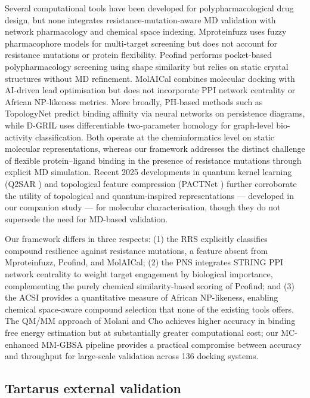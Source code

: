\documentclass[11pt,a4paper]{article}
\begin{document}
Several computational tools have been developed for polypharmacological drug design, but none integrates resistance-mutation-aware MD validation with network pharmacology and chemical space indexing. Mproteinfuzz \citep{molani_cho_2024} uses fuzzy pharmacophore models for multi-target screening but does not account for resistance mutations or protein flexibility. Pcofind performs pocket-based polypharmacology screening using shape similarity but relies on static crystal structures without MD refinement. MolAICal combines molecular docking with AI-driven lead optimisation but does not incorporate PPI network centrality or African NP-likeness metrics. More broadly, PH-based methods such as TopologyNet \citep{topologynet_2018} predict binding affinity via neural networks on persistence diagrams, while D-GRIL \citep{dgril_2026} uses differentiable two-parameter homology for graph-level bio-activity classification. Both operate at the cheminformatics level on static molecular representations, whereas our framework addresses the distinct challenge of flexible protein--ligand binding in the presence of resistance mutations through explicit MD simulation. Recent 2025 developments in quantum kernel learning (Q2SAR \citep{q2sar_2025}) and topological feature compression (PACTNet \citep{pactnet_2025}) further corroborate the utility of topological and quantum-inspired representations --- developed in our companion study \citep{temgoua2026quantum} --- for molecular characterisation, though they do not supersede the need for MD-based validation.

Our framework differs in three respects: (1) the RRS explicitly classifies compound resilience against resistance mutations, a feature absent from Mproteinfuzz, Pcofind, and MolAICal; (2) the PNS integrates STRING PPI network centrality to weight target engagement by biological importance, complementing the purely chemical similarity-based scoring of Pcofind; and (3) the ACSI provides a quantitative measure of African NP-likeness, enabling chemical space-aware compound selection that none of the existing tools offers. The QM/MM approach of Molani and Cho \citep{molani_cho_2024} achieves higher accuracy in binding free energy estimation but at substantially greater computational cost; our MC-enhanced MM-GBSA pipeline provides a practical compromise between accuracy and throughput for large-scale validation across 136 docking systems.

\subsection{Tartarus external validation}
\end{document}
